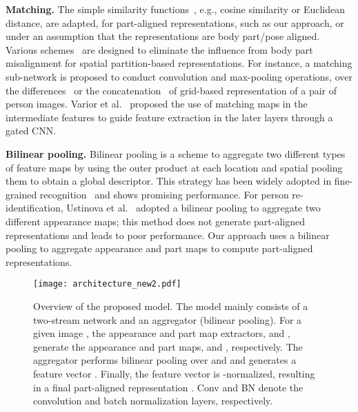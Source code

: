 \documentclass{llncs}
\begin{document}
\vspace{0.1cm}
\noindent\textbf{Matching.}
The simple similarity functions~\cite{deepmetric2014,VariorSLXW16,ChengGZWZ16}, e.g., cosine similarity or Euclidean distance,
are adapted, for part-aligned representations, such as our approach, or under an assumption that the representations are body part/pose aligned. Various schemes~\cite{WangZLZZ16,improved2015,deepreid2014,DCSL2016ijcai} are designed to eliminate the influence
from body part misalignment for spatial partition-based representations. For instance, a matching sub-network is proposed to conduct convolution and max-pooling operations, over the differences~\cite{improved2015} or the concatenation~\cite{deepreid2014,DCSL2016ijcai} of grid-based representation of a pair of person images. Varior et al.~\cite{VariorHW16} proposed the use of matching maps in the intermediate features to guide feature extraction in the later layers through a gated CNN. 

\vspace{0.1cm}
\noindent\textbf{Bilinear pooling.}
Bilinear pooling is a scheme to aggregate two different types of feature maps by using the outer product at each location and spatial pooling them to obtain a global descriptor. This strategy has been widely adopted in fine-grained recognition~\cite{conf/iccv/lin15,conf/cvpr/gao16,conf/iclr/kim17} and shows promising performance. For person re-identification, Ustinova et al.~\cite{conf/avss/ustinova17} adopted a bilinear pooling to aggregate two different appearance maps; this method does not generate part-aligned representations and leads to poor performance. 
Our approach uses a bilinear pooling to aggregate appearance and part maps to compute part-aligned representations.

\begin{figure*}[t]
  \begin{minipage}{0.29\linewidth}
   \end{minipage}
  \begin{minipage}{0.89\linewidth}
   \centering
		\texttt{[image: architecture\_new2.pdf]}
\end{minipage}
\vspace{-0.1cm}
\caption{Overview of the proposed model. The model mainly consists of a two-stream network and an aggregator (bilinear pooling). For a given image , the appearance and part map extractors,  and , generate the appearance and part maps,  and , respectively. The aggregator performs bilinear pooling over  and  and generates a feature vector . Finally, the feature vector is -normalized, resulting in a final part-aligned representation . {\color{black}Conv and BN denote the convolution and batch normalization layers, respectively.}}\label{fig:pipeline}
\end{figure*}
\end{document}
